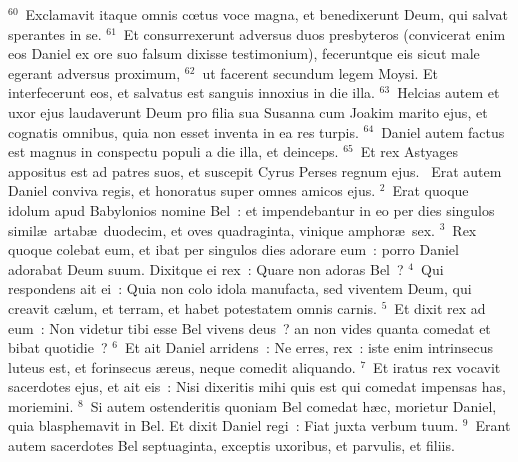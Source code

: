 ${}^{60}$~Exclamavit itaque omnis cœtus voce magna, et benedixerunt Deum, qui salvat sperantes in se.
${}^{61}$~Et consurrexerunt adversus duos presbyteros (convicerat enim eos Daniel ex ore suo falsum dixisse testimonium), feceruntque eis sicut male egerant adversus proximum,
${}^{62}$~ut facerent secundum legem Moysi. Et interfecerunt eos, et salvatus est sanguis innoxius in die illa.
${}^{63}$~Helcias autem et uxor ejus laudaverunt Deum pro filia sua Susanna cum Joakim marito ejus, et cognatis omnibus, quia non esset inventa in ea res turpis.
${}^{64}$~Daniel autem factus est magnus in conspectu populi a die illa, et deinceps.
${}^{65}$~Et rex Astyages appositus est ad patres suos, et suscepit Cyrus Perses regnum ejus.
~Erat autem Daniel conviva regis, et honoratus super omnes amicos ejus.
${}^{2}$~Erat quoque idolum apud Babylonios nomine Bel~: et impendebantur in eo per dies singulos simil\ae\ artab\ae\ duodecim, et oves quadraginta, vinique amphor\ae\ sex.
${}^{3}$~Rex quoque colebat eum, et ibat per singulos dies adorare eum~: porro Daniel adorabat Deum suum. Dixitque ei rex~: Quare non adoras Bel~?
${}^{4}$~Qui respondens ait ei~: Quia non colo idola manufacta, sed viventem Deum, qui creavit c\ae lum, et terram, et habet potestatem omnis carnis.
${}^{5}$~Et dixit rex ad eum~: Non videtur tibi esse Bel vivens deus~? an non vides quanta comedat et bibat quotidie~?
${}^{6}$~Et ait Daniel arridens~: Ne erres, rex~: iste enim intrinsecus luteus est, et forinsecus \ae reus, neque comedit aliquando.
${}^{7}$~Et iratus rex vocavit sacerdotes ejus, et ait eis~: Nisi dixeritis mihi quis est qui comedat impensas has, moriemini.
${}^{8}$~Si autem ostenderitis quoniam Bel comedat h\ae c, morietur Daniel, quia blasphemavit in Bel. Et dixit Daniel regi~: Fiat juxta verbum tuum.
${}^{9}$~Erant autem sacerdotes Bel septuaginta, exceptis uxoribus, et parvulis, et filiis.

